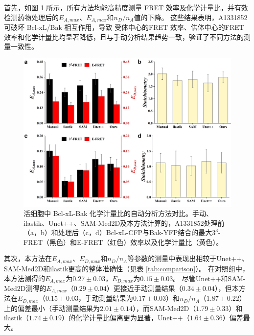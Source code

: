 首先，如图 \ref {fig3} 所示，所有方法均能高精度测量 FRET 效率及化学计量比，并有效检测药物处理后的$E_{A,max}$、$E_{A,max}$和$n_D/n_A$值的下降。
这些结果表明，A1331852可破坏 Bcl-xL/Bak 相互作用，导致 受体中心的FRET 效率、供体中心的FRET效率和化学计量比均显著降低，且与手动分析结果趋势一致，验证了不同方法的测量一致性。
\begin{figure}[!htb]
  \centering
  \includegraphics[width=1\linewidth]{../figures/4/方法对比.drawio.png}
  \caption[活细胞中 Bcl-xL-Bak 化学计量比的自动分析方法对比]{活细胞中 Bcl-xL-Bak 化学计量比的自动分析方法对比。手动、ilastik、Unet++、SAM-Med2D及本方法计算的，A1331852处理前（a，b）和处理后（c，d）Bcl-xL-CFP与Bak-YFP结合的最大$3^3$-FRET（黑色）和E-FRET（红色）效率以及化学计量比（黄色）。}\label{fig3}
\end{figure}

其次，本方法在$E_{A,max}$、$E_{D,max}$和$n_D/n_A$等参数的测量中表现出相较于Unet++、SAM-Med2D和ilastik更高的整体准确性（见表 \ref{tab:comparison}）。
在对照组中，本方法测得的$E_{A,max}$为$0.27\pm0.03$，$E_{D,max}$为$0.15\pm0.03$。
尽管Unet++和SAM-Med2D测得的$E_{A,max}$（$0.29\pm0.04$）更接近手动测量结果（$0.34\pm0.04$），但本方法在$E_{D,max}$（$0.15\pm0.03$，手动测量结果为$0.17\pm0.03$）和$n_D/n_A$（$1.87\pm0.22$）上的偏差最小（手动测量结果为$2.01\pm0.14$），而SAM-Med2D（$1.79\pm0.33$）和ilastik（$1.74\pm0.19$）的化学计量比偏离更为显著，Unet++（$1.64\pm0.36$）偏差最大。

